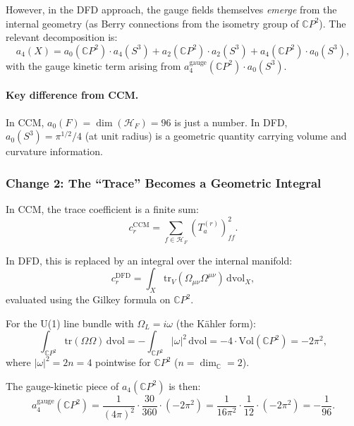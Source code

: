 \documentclass[12pt,a4paper]{article}
\begin{document}
However, in the DFD approach, the gauge fields themselves \emph{emerge}
from the internal geometry (as Berry connections from the isometry group
of $\mathbb{C}P^2$).  The relevant decomposition is:
\begin{equation}
a_4(X) = a_0(\mathbb{C}P^2) \cdot a_4(S^3)
+ a_2(\mathbb{C}P^2) \cdot a_2(S^3)
+ a_4(\mathbb{C}P^2) \cdot a_0(S^3),
\end{equation}
with the gauge kinetic term arising from
$a_4^{\mathrm{gauge}}(\mathbb{C}P^2) \cdot a_0(S^3)$.

\paragraph{Key difference from CCM.}
In CCM, $a_0(F) = \dim(\mathcal{H}_F) = 96$ is just a number.
In DFD, $a_0(S^3) = \pi^{1/2}/4$ (at unit radius) is a geometric
quantity carrying volume and curvature information.

\subsubsection{Change 2: The ``Trace'' Becomes a Geometric Integral}

In CCM, the trace coefficient is a finite sum:
\begin{equation}
c_r^{\mathrm{CCM}} = \sum_{f \in \mathcal{H}_F} (T^{(r)}_a)_{ff}^2.
\end{equation}

In DFD, this is replaced by an integral over the internal manifold:
\begin{equation}
c_r^{\mathrm{DFD}} = \int_X \mathrm{tr}_V(\Omega_{\mu\nu}\Omega^{\mu\nu})\,
\mathrm{dvol}_X,
\end{equation}
evaluated using the Gilkey formula on $\mathbb{C}P^2$.

For the U(1) line bundle with $\Omega_L = i\omega$ (the K\"ahler form):
\begin{equation}
\int_{\mathbb{C}P^2} \mathrm{tr}(\Omega\Omega)\,\mathrm{dvol}
= -\int_{\mathbb{C}P^2} |\omega|^2\,\mathrm{dvol}
= -4 \cdot \mathrm{Vol}(\mathbb{C}P^2) = -2\pi^2,
\end{equation}
where $|\omega|^2 = 2n = 4$ pointwise for $\mathbb{C}P^2$
($n = \dim_{\mathbb{C}} = 2$).

The gauge-kinetic piece of $a_4(\mathbb{C}P^2)$ is then:
\begin{equation}\label{eq:a4-gauge-CP2}
a_4^{\mathrm{gauge}}(\mathbb{C}P^2)
= \frac{1}{(4\pi)^2} \cdot \frac{30}{360}
\cdot (-2\pi^2)
= \frac{1}{16\pi^2} \cdot \frac{1}{12} \cdot (-2\pi^2)
= -\frac{1}{96}.
\end{equation}
\end{document}
